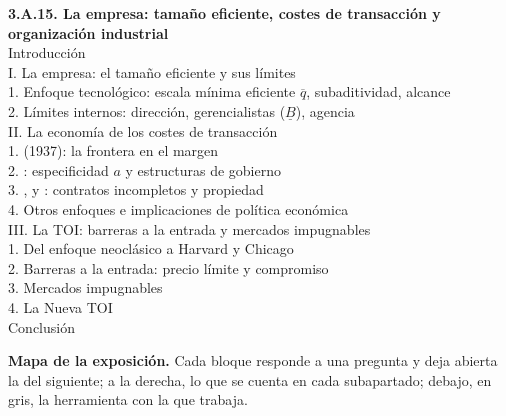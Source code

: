 \documentclass[11pt]{article}
\begin{document}
\begin{esquema}
\textbf{3.A.15. La empresa: tamaño eficiente, costes de transacción y organización industrial}\\[2pt]
Introducción\\
I. La empresa: el tamaño eficiente y sus límites\\
\hspace*{1.5em}1. Enfoque tecnológico: escala mínima eficiente $\overline{q}$, subaditividad, alcance\\
\hspace*{1.5em}2. Límites internos: dirección, gerencialistas ($\underline{B}$), agencia\\
II. La economía de los costes de transacción\\
\hspace*{1.5em}1.  (1937): la frontera en el margen\\
\hspace*{1.5em}2. : especificidad $a$ y estructuras de gobierno\\
\hspace*{1.5em}3. ,  y : contratos incompletos y propiedad\\
\hspace*{1.5em}4. Otros enfoques e implicaciones de política económica\\
III. La TOI: barreras a la entrada y mercados impugnables\\
\hspace*{1.5em}1. Del enfoque neoclásico a Harvard y Chicago\\
\hspace*{1.5em}2. Barreras a la entrada: precio límite y compromiso\\
\hspace*{1.5em}3. Mercados impugnables\\
\hspace*{1.5em}4. La Nueva TOI\\
Conclusión
\end{esquema}

\begin{anotaciones}
\textbf{Mapa de la exposición.} Cada bloque responde a una pregunta y deja abierta la del siguiente; a la derecha, lo que se cuenta en cada subapartado; debajo, en gris, la herramienta con la que trabaja.
\begin{infografiacaja}
\caption{Mapa del tema: la pregunta de cada bloque, sus subapartados y el hilo que los une}\label{figu:mapa-tema}
\end{infografiacaja}
\end{anotaciones}
\end{document}
